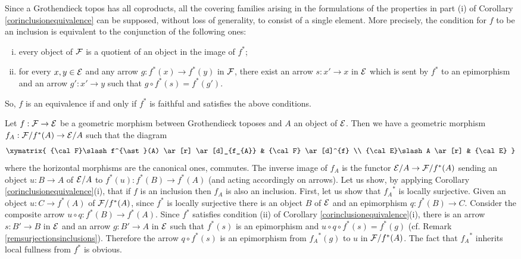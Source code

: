 \documentclass[a4paper,12pt]{article}
\begin{document}
\begin{remark}\label{remsurjectionsinclusions}
	Since a Grothendieck topos has all coproducts, all the covering families arising in the formulations of the properties in part (i) of Corollary \ref{corinclusionequivalence} can be supposed, without loss of generality, to consist of a single element. More precisely, the condition for $f$ to be an inclusion is equivalent to the conjunction of the following ones:  
		\begin{enumerate}[(i)]	
			\item every object of $\cal F$ is a quotient of an object in the image of $f^{\ast}$;
			
			\item for every $x, y\in {\cal E}$ and any arrow $g:f^{\ast}(x)\to f^{\ast}(y)$ in $\cal F$, there exist an arrow $s:x'\to x$ in $\cal E$ which is sent by $f^{\ast}$ to an epimorphism and an arrow $g':x'\to y$ such that $g\circ f^{\ast}(s)=f^{\ast}(g')$.
		\end{enumerate}
		
		So, $f$ is an equivalence if and only if $f^{\ast}$ is faithful and satisfies the above conditions.

\end{remark}

\begin{example}\label{exgeometricinclusion}
	Let $f:{\cal F}\to {\cal E}$ be a geometric morphism between Grothendieck toposes and $A$ an object of $\cal E$. Then we have a geometric morphism $f_{A}:{\cal F}\slash f^{\ast}(A)\to {\cal E}\slash A$ such that the diagram
	$$
	\xymatrix{
		{\cal F}\slash f^{\ast}(A)  \ar[r] \ar[d]_{f_{A}} & {\cal F} \ar[d]^{f} \\
		{\cal E}\slash A \ar[r] & {\cal E}
	} 
	$$  
	where the horizontal morphisms are the canonical ones, commutes. The inverse image of $f_{A}$ is the functor ${\cal E}\slash A \to {\cal F}\slash f^{\ast}(A)$ sending an object $u:B\to A$ of ${\cal E}\slash A$ to $f^{\ast}(u):f^{\ast}(B)\to f^{\ast}(A)$ (and acting accordingly on arrows). Let us show, by applying Corollary \ref{corinclusionequivalence}(i), that if $f$ is an inclusion then $f_{A}$ is also an inclusion. First, let us show that ${f_{A}}^{\ast}$ is locally surjective. Given an object $u:C\to f^{\ast}(A)$ of ${\cal F}\slash f^{\ast}(A)$, since $f^{\ast}$ is locally surjective there is an object $B$ of $\cal E$ and an epimorphism $q:f^{\ast}(B)\to C$. Consider the composite arrow $u\circ q:f^{\ast}(B)\to f^{\ast}(A)$. Since $f^{\ast}$ satisfies condition (ii) of Corollary \ref{corinclusionequivalence}(i), there is an arrow $s:B'\to B$ in $\cal E$ and an arrow $g:B'\to A$ in $\cal E$ such that $f^{\ast}(s)$ is an epimorphism and $u\circ q\circ f^{\ast}(s)=f^{\ast}(g)$ (cf. Remark \ref{remsurjectionsinclusions}). Therefore the arrow $q\circ f^{\ast}(s)$ is an epimorphism from ${f_{A}}^{\ast}(g)$ to $u$ in ${\cal F}\slash f^{\ast}(A)$. The fact that ${f_{A}}^{\ast}$ inherits local fullness from $f^{\ast}$ is obvious. 
\end{example}
\end{document}
